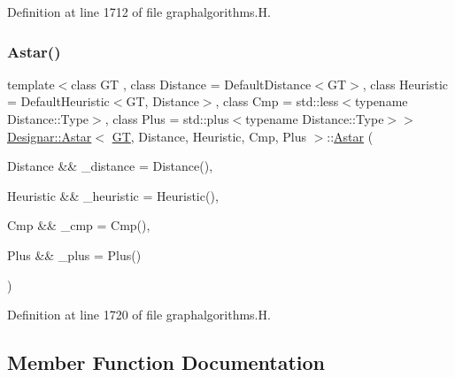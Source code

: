 Definition at line 1712 of file graphalgorithms.\+H.

\mbox{\label{class_designar_1_1_astar_a5db848d589e8e4ce7582acc061cb8b17}} 
\subsubsection{\texorpdfstring{Astar()}{Astar()}\hspace{0.1cm}{\footnotesize\ttfamily [2/2]}}
{\footnotesize\ttfamily template$<$class GT , class Distance  = Default\+Distance$<$\+G\+T$>$, class Heuristic  = Default\+Heuristic$<$\+G\+T, Distance$>$, class Cmp  = std\+::less$<$typename Distance\+::\+Type$>$, class Plus  = std\+::plus$<$typename Distance\+::\+Type$>$$>$ \\
\hyperlink{class_designar_1_1_astar}{Designar\+::\+Astar}$<$ \hyperlink{demo-buildgraph_8_c_a3001c40d2c31ca87ed96cd7d1334a55e}{GT}, Distance, Heuristic, Cmp, Plus $>$\+::\hyperlink{class_designar_1_1_astar}{Astar} (\begin{DoxyParamCaption}\item[{Distance \&\&}]{\+\_\+distance = {\ttfamily Distance()},  }\item[{Heuristic \&\&}]{\+\_\+heuristic = {\ttfamily Heuristic()},  }\item[{Cmp \&\&}]{\+\_\+cmp = {\ttfamily Cmp()},  }\item[{Plus \&\&}]{\+\_\+plus = {\ttfamily Plus()} }\end{DoxyParamCaption})\hspace{0.3cm}{\ttfamily [inline]}}



Definition at line 1720 of file graphalgorithms.\+H.



\subsection{Member Function Documentation}
\mbox{\label{class_designar_1_1_astar_ab6cf1a92f64a96290880a1483eac396f}} 
